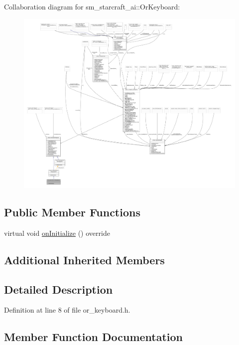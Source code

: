 Collaboration diagram for sm\+\_\+starcraft\+\_\+ai\+:\+:Or\+Keyboard\+:
\nopagebreak
\begin{figure}[H]
\begin{center}
\leavevmode
\includegraphics[width=350pt]{classsm__starcraft__ai_1_1OrKeyboard__coll__graph}
\end{center}
\end{figure}
\subsection*{Public Member Functions}
\begin{DoxyCompactItemize}
\item 
virtual void \hyperlink{classsm__starcraft__ai_1_1OrKeyboard_a56d5ebd1e9382e0e8ca558dac64b8614}{on\+Initialize} () override
\end{DoxyCompactItemize}
\subsection*{Additional Inherited Members}


\subsection{Detailed Description}


Definition at line 8 of file or\+\_\+keyboard.\+h.



\subsection{Member Function Documentation}
\mbox{\label{classsm__starcraft__ai_1_1OrKeyboard_a56d5ebd1e9382e0e8ca558dac64b8614}} 
